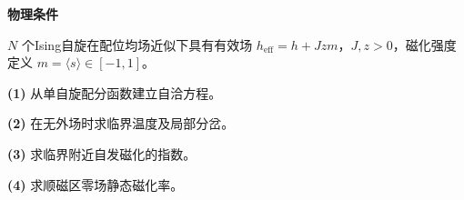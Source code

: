 \textbf{物理条件}\par \(N\) 个Ising自旋在配位均场近似下具有有效场 \(h_{\mathrm{eff}}=h+Jzm\)，\(J,z>0\)，磁化强度定义 \(m=\langle s\rangle\in[-1,1]\)。
\par\noindent\textbf{(1)} 从单自旋配分函数建立自洽方程。
\par\noindent\textbf{(2)} 在无外场时求临界温度及局部分岔。
\par\noindent\textbf{(3)} 求临界附近自发磁化的指数。
\par\noindent\textbf{(4)} 求顺磁区零场静态磁化率。
